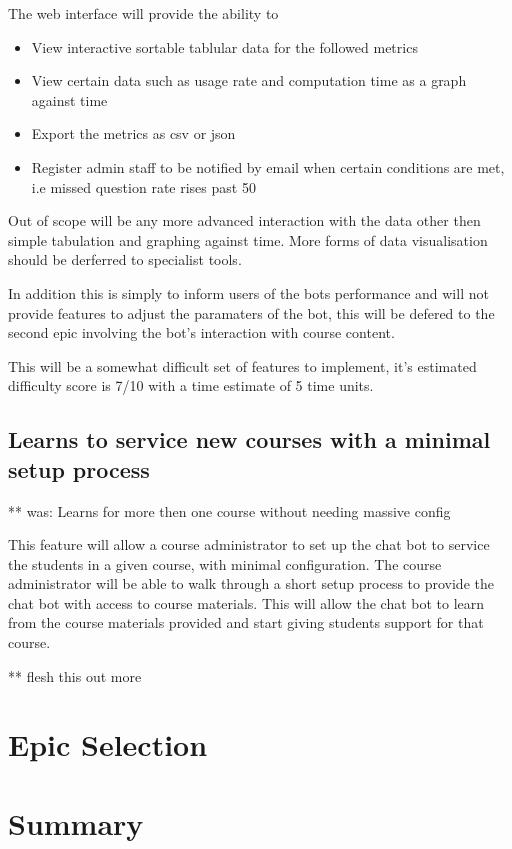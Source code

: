 \documentclass{article}
\begin{document}
The web interface will provide the ability to 
\begin{itemize}
  \item View interactive sortable tablular data for the followed metrics
  \item View certain data such as usage rate and computation time as a graph against time
  \item Export the metrics as csv or json
  \item Register admin staff to be notified by email when certain conditions are met, i.e missed question rate rises past 50%
\end{itemize}

Out of scope will be any more advanced interaction with the data other then simple tabulation and graphing against time. More forms of data visualisation should be derferred to specialist tools. 

In addition this is simply to inform users of the bots performance and will not provide features to adjust the paramaters of the bot, this will be defered to the second epic involving the bot's interaction with course content. 

This will be a somewhat difficult set of features to implement, it's estimated difficulty score is 7/10 with a time estimate of 5 time units.

\subsection{Learns to service new courses with a minimal setup process}

**  was: Learns for more then one course without needing massive config

This feature will allow a course administrator to set up the chat bot to service the students in a given course, with minimal configuration.
The course administrator will be able to walk through a short setup process to provide the chat bot with access to course materials.
This will allow the chat bot to learn from the course materials provided and start giving students support for that course. 

** flesh this out more

\section{Epic Selection}

\section{Summary}
\end{document}
